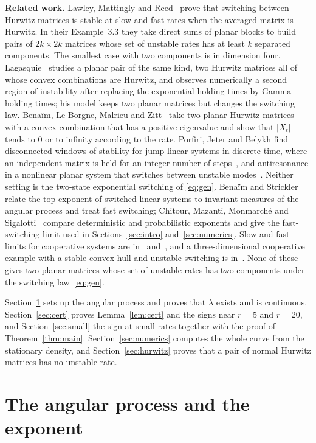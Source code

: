 \documentclass[11pt]{amsart}
\begin{document}
\medskip\noindent\textbf{Related work.}
Lawley, Mattingly and Reed~\cite{LMR14} prove that switching between Hurwitz matrices is stable at slow and fast rates
when the averaged matrix is Hurwitz. In their Example~3.3 they take direct sums of planar blocks to build pairs of
$2k\times2k$ matrices whose set of unstable rates has at least $k$ separated components. The smallest case with two components is in
dimension four. Lagasquie~\cite{Lag16} studies a planar pair of the same kind, two Hurwitz matrices all of whose convex
combinations are Hurwitz, and observes numerically a second region of instability after replacing the exponential
holding times by Gamma holding times; his model keeps two planar matrices but changes the switching law.
Bena\"im, Le Borgne, Malrieu and Zitt~\cite{BLMZ14} take two planar Hurwitz matrices with a convex combination that has
a positive eigenvalue and show that $|X_t|$ tends to $0$ or to infinity according to the rate.
Porfiri, Jeter and Belykh find disconnected windows of stability for jump linear systems in discrete time, where an
independent matrix is held for an integer number of steps~\cite{PJB19}, and antiresonance in a nonlinear planar system
that switches between unstable modes~\cite{PJB21}. Neither setting is the two-state exponential switching of
\eqref{eq:gen}. Bena\"im and Strickler~\cite{BS19} relate the top exponent of switched linear systems to invariant
measures of the angular process and treat fast switching; Chitour, Mazanti, Monmarch\'e and Sigalotti~\cite{CMMS23}
compare deterministic and probabilistic exponents and give the fast-switching limit used in
Sections~\ref{sec:intro} and~\ref{sec:numerics}. Slow and fast limits for cooperative systems are in~\cite{BLSS25} and~\cite{MSS25}, and a
three-dimensional cooperative example with a stable convex hull and unstable switching is in~\cite{MS25}. None of these
gives two planar matrices whose set of unstable rates has two components under the switching law~\eqref{eq:gen}.

Section~\ref{sec:setting} sets up the angular process and proves that $\lambda$ exists and is continuous.
Section~\ref{sec:cert} proves Lemma~\ref{lem:cert} and the signs near $r=5$ and $r=20$, and Section~\ref{sec:small}
the sign at small rates together with the proof of Theorem~\ref{thm:main}. Section~\ref{sec:numerics} computes the
whole curve from the stationary density, and Section~\ref{sec:hurwitz} proves that a pair of normal Hurwitz matrices has no unstable rate.

\section{The angular process and the exponent}\label{sec:setting}
\end{document}
